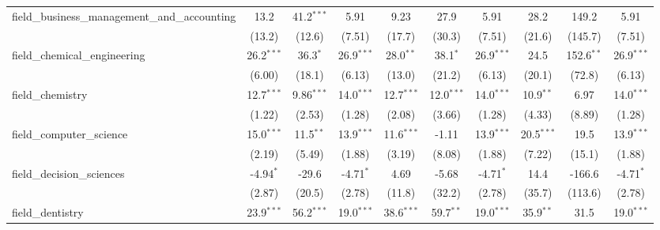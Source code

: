 \begin{tabular}{lccccccccc}
   field\_business\_management\_and\_accounting                & 13.2          & 41.2$^{***}$  & 5.91          & 9.23         & 27.9         & 5.91          & 28.2           & 149.2          & 5.91\\   
                                                               & (13.2)        & (12.6)        & (7.51)        & (17.7)       & (30.3)       & (7.51)        & (21.6)         & (145.7)        & (7.51)\\   
   field\_chemical\_engineering                                & 26.2$^{***}$  & 36.3$^{*}$    & 26.9$^{***}$  & 28.0$^{**}$  & 38.1$^{*}$   & 26.9$^{***}$  & 24.5           & 152.6$^{**}$   & 26.9$^{***}$\\   
                                                               & (6.00)        & (18.1)        & (6.13)        & (13.0)       & (21.2)       & (6.13)        & (20.1)         & (72.8)         & (6.13)\\   
   field\_chemistry                                            & 12.7$^{***}$  & 9.86$^{***}$  & 14.0$^{***}$  & 12.7$^{***}$ & 12.0$^{***}$ & 14.0$^{***}$  & 10.9$^{**}$    & 6.97           & 14.0$^{***}$\\   
                                                               & (1.22)        & (2.53)        & (1.28)        & (2.08)       & (3.66)       & (1.28)        & (4.33)         & (8.89)         & (1.28)\\   
   field\_computer\_science                                    & 15.0$^{***}$  & 11.5$^{**}$   & 13.9$^{***}$  & 11.6$^{***}$ & -1.11        & 13.9$^{***}$  & 20.5$^{***}$   & 19.5           & 13.9$^{***}$\\   
                                                               & (2.19)        & (5.49)        & (1.88)        & (3.19)       & (8.08)       & (1.88)        & (7.22)         & (15.1)         & (1.88)\\   
   field\_decision\_sciences                                   & -4.94$^{*}$   & -29.6         & -4.71$^{*}$   & 4.69         & -5.68        & -4.71$^{*}$   & 14.4           & -166.6         & -4.71$^{*}$\\   
                                                               & (2.87)        & (20.5)        & (2.78)        & (11.8)       & (32.2)       & (2.78)        & (35.7)         & (113.6)        & (2.78)\\   
   field\_dentistry                                            & 23.9$^{***}$  & 56.2$^{***}$  & 19.0$^{***}$  & 38.6$^{***}$ & 59.7$^{**}$  & 19.0$^{***}$  & 35.9$^{**}$    & 31.5           & 19.0$^{***}$\\   

\end{tabular}
